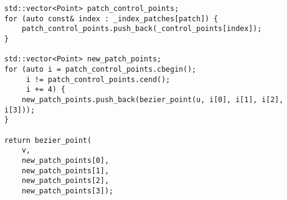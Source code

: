 \begin{lstlisting}
std::vector<Point> patch_control_points;
for (auto const& index : _index_patches[patch]) {
    patch_control_points.push_back(_control_points[index]);
}

std::vector<Point> new_patch_points;
for (auto i = patch_control_points.cbegin();
     i != patch_control_points.cend();
     i += 4) {
    new_patch_points.push_back(bezier_point(u, i[0], i[1], i[2], i[3]));
}

return bezier_point(
    v,
    new_patch_points[0],
    new_patch_points[1],
    new_patch_points[2],
    new_patch_points[3]);
\end{lstlisting}

